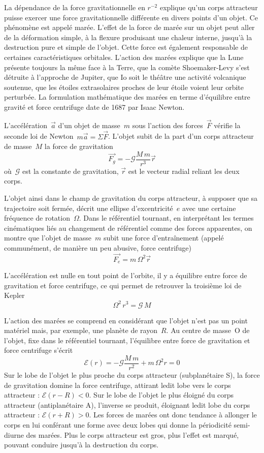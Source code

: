 \sk
La dépendance de la force gravitationnelle en $r^{-2}$ explique qu'un corps attracteur puisse exercer une force gravitationnelle différente en divers points d'un objet. Ce phénomène est appelé marée. L'effet de la force de marée sur un objet peut aller de la déformation simple, à la flexure produisant une chaleur interne, jusqu'à la destruction pure et simple de l'objet. Cette force est également responsable de certaines caractéristiques orbitales. L'action des marées explique que la Lune présente toujours la même face à la Terre, que la comète Shoemaker-Levy s'est détruite à l'approche de Jupiter, que Io soit le théâtre une activité volcanique soutenue, que les étoiles extrasolaires proches de leur étoile voient leur orbite perturbée. La formulation mathématique des marées en terme d'équilibre entre gravité et force centrifuge date de 1687 par Isaac Newton. 

\sk
L'accélération~$\vec{a}$ d'un objet de masse~$m$ sous l'action des forces~$\vec{F}$ vérifie la seconde loi de Newton~$m \vec{a} = \Sigma \vec{F}$. L'objet subit de la part d'un corps attracteur de masse~$M$ la force de gravitation
\[ \vec{F_g} = -\mathcal{G} \frac{M\,m}{r^3} \vec{r} \]
\noindent où~$\mathcal{G}$ est la constante de gravitation, $\vec{r}$ est le vecteur radial reliant les deux corps. 

\sk
L'objet ainsi dans le champ de gravitation du corps attracteur, à supposer que sa trajectoire soit fermée, décrit une ellipse d'excentricité~$e$ avec une certaine fréquence de rotation~$\Omega$. Dans le référentiel tournant, en interprétant les termes cinématiques liés au changement de référentiel comme des forces apparentes, on montre que l'objet de masse~$m$ subit une force d'entraînement (appelé communément, de manière un peu abusive, force centrifuge)
\[ \vec{F_e} = m \, \Omega^2 \vec{r} \]

\sk
L'accélération est nulle en tout point de l'orbite, il y a équilibre entre force de gravitation et force centrifuge, ce qui permet de retrouver la troisième loi de Kepler
\[ \Omega^2 \, r^3 = \mathcal{G} \, M  \]

\sk
L'action des marées se comprend en considérant que l'objet n'est pas un point matériel mais, par exemple, une planète de rayon~$R$. Au centre de masse~O de l'objet, fixe dans le référentiel tournant, l'équilibre entre force de gravitation et force centrifuge s'écrit
\[ \mathcal{E}(r) = -\mathcal{G} \frac{M\,m}{r^2} + m \, \Omega^2 r = 0 \]
Sur le lobe de l'objet le plus proche du corps attracteur (subplanétaire S), la force de gravitation domine la force centrifuge, attirant ledit lobe vers le corps attracteur : $\mathcal{E}(r-R) < 0$. Sur le lobe de l'objet le plus éloigné du corps attracteur (antiplanétaire A), l'inverse se produit, éloignant ledit lobe du corps attracteur : $\mathcal{E}(r+R) > 0$. Les forces de marées ont donc tendance à allonger le corps en lui conférant une forme avec deux lobes qui donne la périodicité semi-diurne des marées. Plus le corps attracteur est gros, plus l'effet est marqué, pouvant conduire jusqu'à la destruction du corps.

